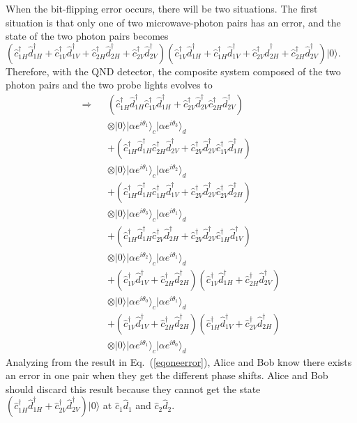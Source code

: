 \documentclass[showpacs,aps,graphicx,twocolumn]{revtex4}
\begin{document}
When the bit-flipping error occurs, there will be two situations.
The first situation is that only one of two microwave-photon pairs
has an error, and the state of the two photon pairs becomes
$(\hat{c}_{1H}^{\dag}\hat{d}_{1H}^{\dag}+\hat{c}_{1V}^{\dag}\hat{d}_{1V}^{\dag}
+\hat{c}_{2H}^{\dag}\hat{d}_{2H}^{\dag}+\hat{c}_{2V}^{\dag}\hat{d}_{2V}^{\dag})
(\hat{c}_{1V}^{\dag}\hat{d}_{1H}^{\dag}+\hat{c}_{1H}^{\dag}\hat{d}_{1V}^{\dag}
+\hat{c}_{2V}^{\dag}\hat{d}_{2H}^{\dag}+\hat{c}_{2H}^{\dag}\hat{d}_{2V}^{\dag})|0\rangle$.
Therefore, with the QND detector, the composite system composed of
the two photon pairs and the two probe lights evolves to
\begin{eqnarray}        \label{eqoneerror}
\Longrightarrow&&(\hat{c}_{1H}^{\dag}\hat{d}_{1H}^{\dag}\hat{c}_{1V}^{\dag}\hat{d}_{1H}^{\dag}
+\hat{c}_{2V}^{\dag}\hat{d}_{2V}^{\dag}\hat{c}_{2H}^{\dag}\hat{d}_{2V}^{\dag})\nonumber\\
&&\otimes|0\rangle|\alpha e^{i\theta_{1}}\rangle_{c}|\alpha e^{i\theta_{3}}\rangle_{d}\nonumber\\
&&+(\hat{c}_{1H}^{\dag}\hat{d}_{1H}^{\dag}\hat{c}_{2H}^{\dag}\hat{d}_{2V}^{\dag}
+\hat{c}_{2V}^{\dag}\hat{d}_{2V}^{\dag}\hat{c}_{1V}^{\dag}\hat{d}_{1H}^{\dag})\nonumber\\
&&\otimes|0\rangle|\alpha e^{i\theta_{1}}\rangle_{c}|\alpha e^{i\theta_{2}}\rangle_{d}\nonumber\\
&&+(\hat{c}_{1H}^{\dag}\hat{d}_{1H}^{\dag}\hat{c}_{1H}^{\dag}\hat{d}_{1V}^{\dag}
+\hat{c}_{2V}^{\dag}\hat{d}_{2V}^{\dag}\hat{c}_{2V}^{\dag}\hat{d}_{2H}^{\dag})\nonumber\\
&&\otimes|0\rangle|\alpha e^{i\theta_{3}}\rangle_{c}|\alpha e^{i\theta_{1}}\rangle_{d}\nonumber\\
&&+(\hat{c}_{1H}^{\dag}\hat{d}_{1H}^{\dag}\hat{c}_{2V}^{\dag}\hat{d}_{2H}^{\dag}
+\hat{c}_{2V}^{\dag}\hat{d}_{2V}^{\dag}\hat{c}_{1H}^{\dag}\hat{d}_{1V}^{\dag})\nonumber\\
&&\otimes|0\rangle|\alpha e^{i\theta_{2}}\rangle_{c}|\alpha e^{i\theta_{1}}\rangle_{d}\nonumber\\
&&+(\hat{c}_{1V}^{\dag}\hat{d}_{1V}^{\dag}+\hat{c}_{2H}^{\dag}\hat{d}_{2H}^{\dag})
(\hat{c}_{1V}^{\dag}\hat{d}_{1H}^{\dag}+\hat{c}_{2H}^{\dag}\hat{d}_{2V}^{\dag})\nonumber\\
&&\otimes|0\rangle|\alpha e^{i\theta_{0}}\rangle_{c}|\alpha e^{i\theta_{1}}\rangle_{d}\nonumber\\
&&+(\hat{c}_{1V}^{\dag}\hat{d}_{1V}^{\dag}+\hat{c}_{2H}^{\dag}\hat{d}_{2H}^{\dag})
(\hat{c}_{1H}^{\dag}\hat{d}_{1V}^{\dag}+\hat{c}_{2V}^{\dag}\hat{d}_{2H}^{\dag})\nonumber\\
&&\otimes|0\rangle|\alpha e^{i\theta_{1}}\rangle_{c}|\alpha e^{i\theta_{0}}\rangle_{d}
\end{eqnarray}
Analyzing from the result in Eq.~(\ref{eqoneerror}), Alice and Bob
know there exists an error in one pair when they get the different
phase shifts. Alice and Bob should discard this result because they
cannot get the state
$(\hat{c}_{1H}^{\dag}\hat{d}_{1H}^{\dag}+\hat{c}_{2V}^{\dag}\hat{d}_{2V}^{\dag})|0\rangle$
at $\hat{c}_{1}\hat{d}_{1}$ and $\hat{c}_{2}\hat{d}_{2}$.
\end{document}
